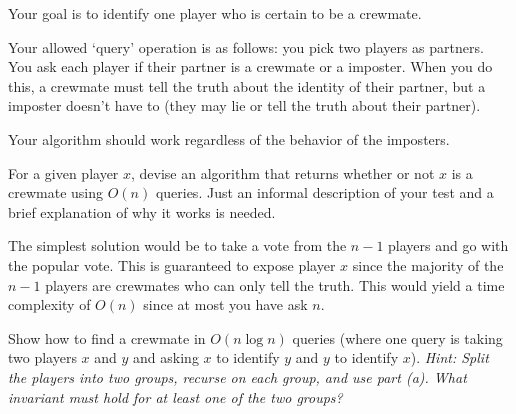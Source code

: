 \documentclass[11pt]{article}
\begin{document}
Your goal is to identify one player who is certain to be a crewmate.

Your allowed `query' operation is as follows: you pick two players as partners. You ask each player if their partner is a crewmate or a imposter.
When you do this, a crewmate must tell the truth about the identity of their partner,
but a imposter doesn't have to (they may lie or tell the truth about their partner).

Your algorithm should work regardless of the behavior of the imposters.

\begin{subparts}
	\subpart For a given player $x$, devise an algorithm that returns whether or not $x$ is a crewmate using $O(n)$ queries. Just an informal description of your test and a brief explanation of why it works is needed.\\
    \begin{solution}
        The simplest solution would be to take a vote from the $n-1$ players and go with the popular vote. This is guaranteed
        to expose player $x$ since the majority of the $n-1$ players are crewmates who can only tell the truth. This would yield a time complexity 
        of $O(n)$ since at most you have ask $n$. 
    \end{solution}
    \newpage
	\subpart Show how to find a crewmate in $O(n\log n)$ queries (where one query is taking two players $x$ and $y$ and asking $x$ to identify $y$ and $y$ to identify $x$).
	\textit{Hint: Split the players into two groups, recurse on each group, and use part (a). What invariant must hold for at least one of the two groups?}


\end{subparts}
\end{document}
